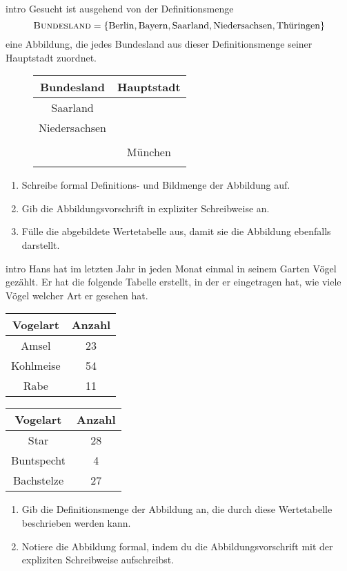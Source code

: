 \documentclass[../funktionen.tex]{subfiles}
\begin{document}
\begin{exercise}{intro}
    Gesucht ist ausgehend von der Definitionsmenge \[\textsc{Bundesland}=\{\text{Berlin},\text{Bayern},\text{Saarland},\text{Niedersachsen},\text{Thüringen}\}\] eine Abbildung, die jedes Bundesland aus dieser Definitionsmenge seiner Hauptstadt zuordnet.
    \begin{wrapfigure}{r}{.4\textwidth}
        \centering
        \begin{tabular}{cc}\toprule
            Bundesland & Hauptstadt\\\midrule
            Saarland & \\
            Niedersachsen & \\
             & \\
             & München\\
             & \\\bottomrule
        \end{tabular}
    \end{wrapfigure}
    \begin{enumerate}
        \item Schreibe formal Definitions- und Bildmenge der Abbildung auf.
        \item Gib die Abbildungsvorschrift in expliziter Schreibweise an.
        \item Fülle die abgebildete Wertetabelle aus, damit sie die Abbildung ebenfalls darstellt.
    \end{enumerate}
\end{exercise}
\begin{exercise}{intro}
    Hans hat im letzten Jahr in jeden Monat einmal in seinem Garten Vögel gezählt. Er hat die folgende Tabelle erstellt, in der er eingetragen hat, wie viele Vögel welcher Art er gesehen hat.
    \begin{center}
        \begin{tabular}{cc}\toprule
            Vogelart & Anzahl\\\midrule
            Amsel & 23\\
            Kohlmeise & 54\\
            Rabe & 11\\\bottomrule
        \end{tabular}
        \begin{tabular}{cc}\toprule
            Vogelart & Anzahl\\\midrule
            Star & 28\\
            Buntspecht & 4\\
            Bachstelze & 27\\\bottomrule
        \end{tabular}
    \end{center}
    \begin{enumerate}
        \item Gib die Definitionsmenge der Abbildung an, die durch diese Wertetabelle beschrieben werden kann.
        \item Notiere die Abbildung formal, indem du die Abbildungsvorschrift mit der expliziten Schreibweise aufschreibst.
    \end{enumerate}
\end{exercise}
\end{document}
